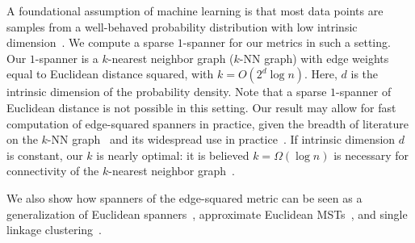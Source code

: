  A foundational assumption of
machine learning is that most data points are samples from a
well-behaved probability
distribution with low intrinsic dimension~\cite{tenenbaum00global,
gorban07principal, vandermaaten08visualizing, Hashi15, mcqueen16megaman,
hwang2016}.
We compute a sparse
$1$-spanner for our metrics in such a setting. Our $1$-spanner is a $k$-nearest neighbor graph ($k$-NN graph)
with edge weights equal to Euclidean distance squared, with $k = O(2^d \log n)$. Here, $d$ is the
intrinsic dimension of the probability density.
Note that a sparse $1$-spanner of
Euclidean distance is not possible in this setting.
Our result may allow for fast computation of edge-squared spanners in
practice, given the breadth of
literature on the $k$-NN graph~\cite{Brito97, Dong11, Chen11}
and its widespread
use in practice~\cite{tenenbaum00global, vL09, Dong11}.
If intrinsic dimension $d$ is constant,
our $k$ is nearly optimal:
it is believed $k=\Omega(\log n)$ is necessary for
connectivity of the $k$-nearest neighbor
graph~\cite{Balister05,Gonzales2003, vL09}.

We also show how spanners of the edge-squared metric can be seen as a generalization of
Euclidean spanners~\cite{Vaidya1991, Elkin2013, arya95euclid,
Callahan1993}, approximate Euclidean
MSTs~\cite{Callahan1995, Andoni2014, Arya2016, Alman2016, Yaro2017}, and
single linkage clustering~\cite{Gower1969, Yaro2017}.


